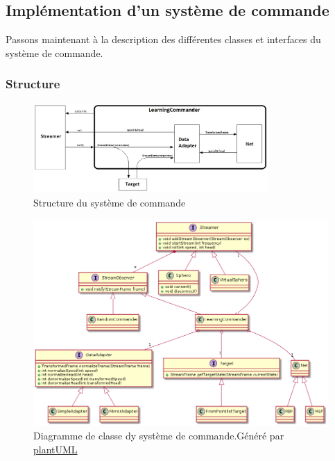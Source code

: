 \subsection{Implémentation d'un système de commande}\label{sec:impcommander}
Passons maintenant à la description des différentes classes et interfaces du système de commande.

\newcommand{\classname}[1]{\textbf{\texttt{#1}}}
\subsubsection{Structure}
\begin{figure}
 \centering
 \includegraphics[width=0.8\textwidth]{../figures/commander.jpg}
 \caption{Structure du système de commande}
 \label{fig:commander}
\end{figure}
\begin{figure}
 \centering
 \includegraphics[width=\textwidth]{../../uml/commanderdiag.png}
 \caption{Diagramme de classe dy système de commande.\footnotesize Généré par \href{http://plantuml.com/class-diagram}{plantUML}}
 \label{fig:commanderdiag}
\end{figure}

